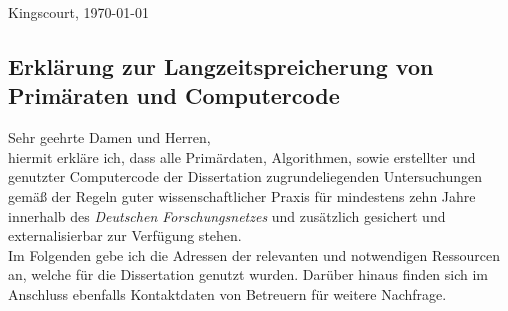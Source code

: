 \documentclass[
  fontsize=11pt,
  paper=a4,
]{report}
\begin{document}

    \begin{flushright}
      Kingscourt, \today\\[1cm]%
    \end{flushright}

    \subsection*{%
        Erklärung zur Langzeitspreicherung von Primäraten und Computercode%
    }%
        \vspace*{0.5cm}%
        Sehr geehrte Damen und Herren,\\[0.5cm]%
%
    hiermit erkläre ich, dass alle Primärdaten, Algorithmen, sowie erstellter und genutzter Computercode der Dissertation zugrundeliegenden Untersuchungen gemäß der Regeln guter wissenschaftlicher Praxis für mindestens zehn Jahre innerhalb des \textit{Deutschen Forschungsnetzes} und zusätzlich gesichert und externalisierbar zur Verfügung stehen.\\[0.5cm]%
%
    Im Folgenden gebe ich die Adressen der relevanten und notwendigen Ressourcen an, welche für die Dissertation genutzt wurden. Darüber hinaus finden sich im Anschluss ebenfalls Kontaktdaten von Betreuern für weitere Nachfrage.\\%
%
\end{document}
